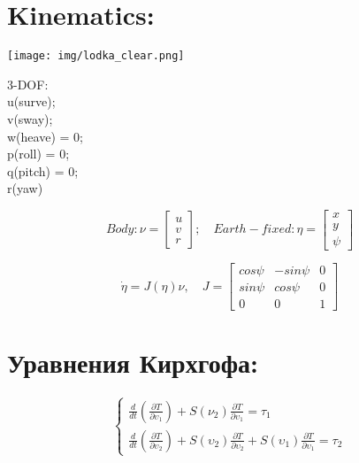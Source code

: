 \newpage

\section*{Kinematics:}

\begin{center}
\texttt{[image: img/lodka\_clear.png]}\\
\end{center} 

3-DOF: \\

u(surve); \\

v(sway); \\

w(heave) = 0; \\

p(roll) = 0; \\

q(pitch) = 0; \\

r(yaw) \\



\begin{center}
\begin{equation*}
Body: \nu = \begin{bmatrix}
u \\
v \\
r
\end{bmatrix};\quad Earth-fixed: \eta = \begin{bmatrix}
 x \\
 y \\
 \psi
 \end{bmatrix} 
\end{equation*} 
\end{center}
\begin{equation*}
\Dot{\eta} = J(\eta)\nu, \quad J = \begin{bmatrix}
cos\psi & -sin\psi & 0 \\
sin\psi & cos\psi & 0 \\
0 & 0 & 1
 \end{bmatrix} 
\end{equation*}


\newpage
\section*{Уравнения Кирхгофа:}
\large
\begin{equation*}
 \begin{cases}
   \frac{d}{dt}(\frac{\partial T}{\partial \upsilon_1}) + S(\nu_2)\frac{\partial T}{\partial \upsilon_1} = \tau_1\\
   \frac{d}{dt}(\frac{\partial T}{\partial \upsilon_2}) + S(\upsilon_2)\frac{\partial T}{\partial \upsilon_2} + S(\upsilon_1)\frac{\partial T}{\partial \upsilon_1} = \tau_2
 \end{cases}
 \end{equation*}
 
